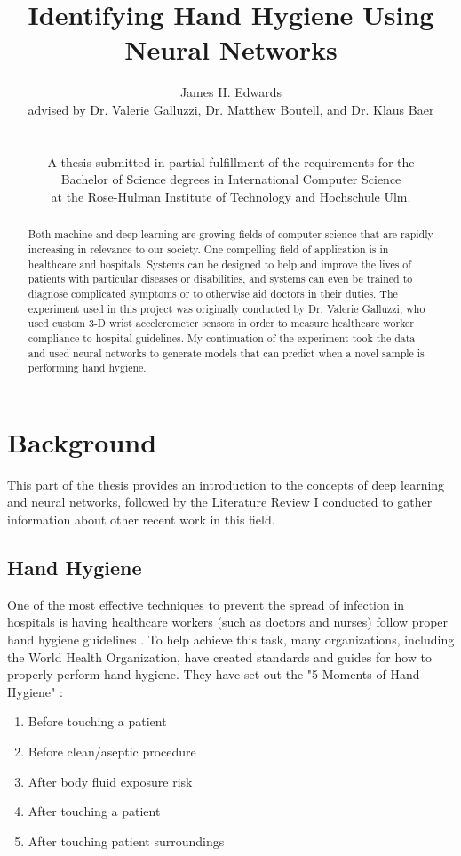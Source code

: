 \documentclass[]{report}
\title{Identifying Hand Hygiene Using Neural Networks}
\author{James H. Edwards \\ 
	advised by Dr. Valerie Galluzzi, Dr. Matthew Boutell, and Dr. Klaus Baer\\
	\\
	\\
	A thesis submitted in partial fulfillment of the requirements for the \\
	Bachelor of Science degrees in International Computer Science \\
	at the Rose-Hulman Institute of Technology and Hochschule Ulm.}
\begin{document}
\maketitle
\tableofcontents



\begin{abstract}
	Both machine and deep learning are growing fields of computer science that are rapidly increasing in relevance to our society. One compelling field of application is in healthcare and hospitals. Systems can be designed to help and improve the lives of patients with particular diseases or disabilities, and systems can even be trained to diagnose complicated symptoms or to otherwise aid doctors in their duties. The experiment used in this project was originally conducted by Dr. Valerie Galluzzi, who used custom 3-D wrist accelerometer sensors in order to measure healthcare worker compliance to hospital guidelines. My continuation of the experiment took the data and used neural networks to generate models that can predict when a novel sample is performing hand hygiene. 
\end{abstract}

\chapter{Background}

This part of the thesis provides an introduction to the concepts of deep learning and neural networks, followed by the Literature Review I conducted to gather information about other recent work in this field.

\section{Hand Hygiene}

One of the most effective techniques to prevent the spread of infection in hospitals is having healthcare workers (such as doctors and nurses) follow proper hand hygiene guidelines \cite{Galluzzi}. To help achieve this task, many organizations, including the World Health Organization, have created standards and guides for how to properly perform hand hygiene. They have set out the "5 Moments of Hand Hygiene" \cite{WHO}:
\begin{enumerate}
	\item Before touching a patient
	\item Before clean/aseptic procedure
	\item After body fluid exposure risk
	\item After touching a patient
	\item After touching patient surroundings
\end{enumerate}
\end{document}
